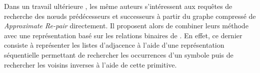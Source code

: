 
	Dans un travail ultérieure \citep{claude2010extended} , les même auteurs s'intéressent aux requêtes de recherche des nœuds prédécesseurs et successeurs à partir du graphe compressé de \textit{Approximate Re-pair} directement. Il proposent alors de combiner leurs méthode avec une représentation basé sur les relations binaires de \citep{barbay2006adaptive}. En effet, ce dernier consiste à représenter les listes d'adjacence à l'aide d'une représentation séquentielle permettant de rechercher les occurrences d'un symbole puis de rechercher les voisins inverses à l'aide de cette primitive. 